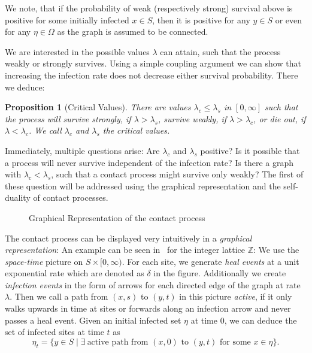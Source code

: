\documentclass[a4paper,11pt]{amsart}
\theoremstyle{theorem}
\newtheorem{proposition}[theorem]{Proposition}
\theoremstyle{definition}
\newcommand{\Z}{\mathbb{Z}}
\begin{document}
We note, that if the probability of weak (respectively strong) survival above is positive for some  initially infected $x\in S$, then it is positive for any $y\in S$ or even for any $\eta \in \Omega$ as the graph is assumed to be connected.

We are interested in the possible values $\lambda$ can attain, such that the process weakly or strongly survives.
Using a simple coupling argument we can show that increasing the infection rate does not decrease either survival probability. There we deduce:

\begin{proposition}[Critical Values]
	There are values $\lambda_c \leq \lambda_s$ in $[0,\infty]$ such that the process will survive strongly, if $\lambda > \lambda_s$, survive weakly, if $\lambda > \lambda_c$, or die out, if $\lambda < \lambda_c$.
	We call $\lambda_c$ and $\lambda_s$ the \emph{critical values}.
\end{proposition}


Immediately, multiple questions arise:
Are $\lambda_c$ and $\lambda_s$ positive? Is it possible that a process will never survive independent of the infection rate?
Is there a graph with $\lambda_c < \lambda_s$, such that a contact process might survive only weakly?
The first of these question will be addressed using the graphical representation and the self-duality of contact processes.

\begin{figure}[h]

\caption{Graphical Representation of the contact process}
\label{fig:graphical-rep}
\end{figure}

The contact process can be displayed very intuitively in a \emph{graphical representation}:
An example can be seen in~ for the integer lattice $\Z$:
We use the \emph{space-time} picture on $S\times [0,\infty)$. For each site, we generate \emph{heal events} at a unit exponential rate which are denoted as $\delta$ in the figure.
Additionally we create \emph{infection events} in the form of arrows for each directed edge of the graph at rate $\lambda$.
Then we call a path from $(x,s)$ to $(y,t)$ in this picture \emph{active}, if it only walks upwards in time at sites or forwards along an infection arrow and never passes a heal event.
Given an initial infected set $\eta$ at time $0$, we can deduce the set of infected sites at time $t$ as $$\eta_t = \{y\in S\mid \exists\ \text{active path from $(x,0)$ to $(y,t)$ for some $x\in\eta$}\}.$$
\end{document}
